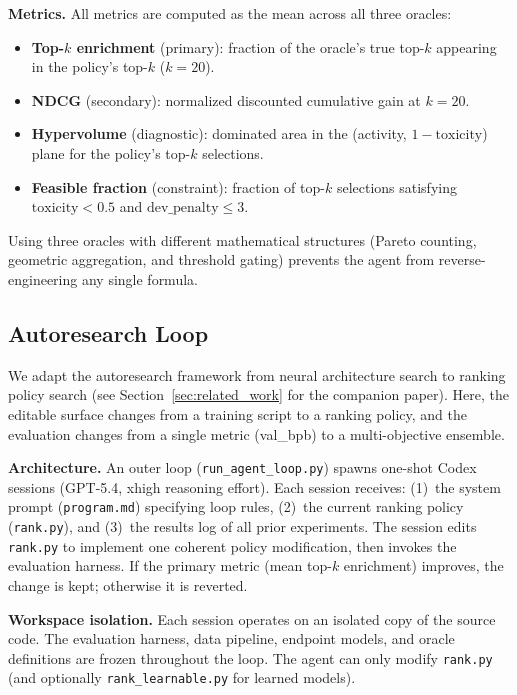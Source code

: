\textbf{Metrics.}
All metrics are computed as the mean across all three oracles:
\begin{itemize}[nosep]
  \item \textbf{Top-$k$ enrichment} (primary): fraction of the oracle's true top-$k$ appearing in the policy's top-$k$ ($k = 20$).
  \item \textbf{NDCG} \citep{jarvelin2002ndcg} (secondary): normalized discounted cumulative gain at $k = 20$.
  \item \textbf{Hypervolume} \citep{zitzler2003hypervolume} (diagnostic): dominated area in the (activity, $1 - \text{toxicity}$) plane for the policy's top-$k$ selections.
  \item \textbf{Feasible fraction} (constraint): fraction of top-$k$ selections satisfying $\text{toxicity} < 0.5$ and $\text{dev\_penalty} \leq 3$.
\end{itemize}

Using three oracles with different mathematical structures (Pareto counting, geometric aggregation, and threshold gating) prevents the agent from reverse-engineering any single formula.

\subsection{Autoresearch Loop}
\label{sec:loop}

We adapt the autoresearch framework \citep{karpathy2026autoresearch} from neural architecture search to ranking policy search (see Section~\ref{sec:related_work} for the companion paper).
Here, the editable surface changes from a training script to a ranking policy, and the evaluation changes from a single metric (val\_bpb) to a multi-objective ensemble.

\textbf{Architecture.}
An outer loop (\texttt{run\_agent\_loop.py}) spawns one-shot Codex sessions (GPT-5.4, xhigh reasoning effort).
Each session receives: (1)~the system prompt (\texttt{program.md}) specifying loop rules, (2)~the current ranking policy (\texttt{rank.py}), and (3)~the results log of all prior experiments.
The session edits \texttt{rank.py} to implement one coherent policy modification, then invokes the evaluation harness.
If the primary metric (mean top-$k$ enrichment) improves, the change is kept; otherwise it is reverted.

\textbf{Workspace isolation.}
Each session operates on an isolated copy of the source code.
The evaluation harness, data pipeline, endpoint models, and oracle definitions are frozen throughout the loop.
The agent can only modify \texttt{rank.py} (and optionally \texttt{rank\_learnable.py} for learned models).

